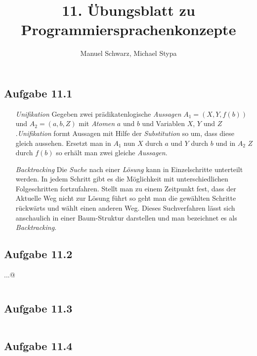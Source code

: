 \documentclass[a4paper, 12pt]{article}
\title{11. Übungsblatt zu Programmiersprachenkonzepte}
\author{Manuel Schwarz, Michael Stypa}
\begin{document}
\maketitle

\subsection*{Aufgabe 11.1}
\begin{itemize}
  \item[\emph{Unifikation}]
    Gegeben zwei prädikatenlogische \emph{Aussagen} $A_1 = (X, Y, f(b))$ und
    $A_2 = (a, b, Z)$ mit \emph{Atomen} $a$ und $b$ und Variablen $X$, $Y$ und
    $Z$.\emph{Unifikation} formt Aussagen mit Hilfe der \emph{Substitution} so
    um, dass diese gleich aussehen. Ersetzt man in $A_1$ nun $X$ durch $a$ und
    $Y$ durch $b$ und in $A_2$ $Z$ durch $f(b)$ so erhält man zwei gleiche
    \emph{Aussagen}.
  \item[\emph{Backtracking}]
    Die \emph{Suche} nach einer \emph{Lösung} kann in Einzelschritte unterteilt
    werden. In jedem Schritt gibt es die Möglichkeit mit unterschiedlichen
    Folgeschritten fortzufahren. Stellt man zu einem Zeitpunkt fest, dass der
    Aktuelle Weg nicht zur Lösung führt so geht man die gewählten Schritte
    rückwärts und wählt einen anderen Weg. Dieses Suchverfahren lässt sich
    anschaulich in einer Baum-Struktur darstellen und man bezeichnet es als
    \emph{Backtracking}.
\end{itemize}

\subsection*{Aufgabe 11.2}
\texttt@...@
\inputminted[firstline=58, firstnumber=58, linenos=true]{prolog}{verwandte.pl}

\subsection*{Aufgabe 11.3}
\inputminted[linenos=true]{prolog}{laenge.pl}

\subsection*{Aufgabe 11.4}
\inputminted[linenos=true, firstnumber=12]{prolog}{reise.pl}
\end{document}
